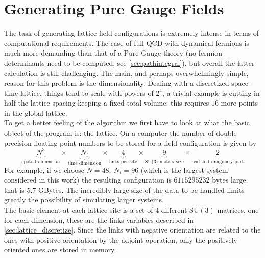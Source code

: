\section{Generating Pure Gauge Fields} 
The task of generating lattice field configurations is extremely intense in terms of computational requirements. The case of full QCD with dynamical fermions is much more demanding than that of a Pure Gauge theory (no fermion determinants need to be computed, see \cref{sec:pathintegral}), but overall the latter calculation is still challenging. The main, and perhaps overwhelmingly simple, reason for this problem is the dimensionality. Dealing with a discretized space-time lattice, things tend to scale with powers of $2^4$, a trivial example is cutting in half the lattice spacing keeping a fixed total volume: this requires $16$ more points in the global lattice. \\
To get a better feeling of the algorithm we first have to look at what the basic object of the program is: the lattice. On a computer the number of double precision floating point numbers to be stored for a field configuration is given by
\begin{equation}
    \underbrace{N^3}_\text{spatial dimension} \times
    \underbrace{N_t}_\text{time dimension} \times
    \underbrace{4}_\text{links per site} \times 
    \underbrace{9}_\text{SU(3) matrix size} \times
    \underbrace{2}_\text{real and imaginary part}
\end{equation}
For example, if we choose $N=48,~N_t=96$ (which is the largest system considered in this work) the resulting configuration is $6115295232$ bytes large, that is $5.7$ GBytes.  The incredibly large size of the data to be handled limits greatly the possibility of simulating larger systems. \\
The basic element at each lattice site is a set of $4$ different $\mathrm{SU}(3)$ matrices, one for each dimension, these are the links variables described in \cref{sec:lattice_discretize}. Since the links with negative orientation are related to the ones with positive orientation by the adjoint operation, only the positively oriented ones are stored in memory.  

